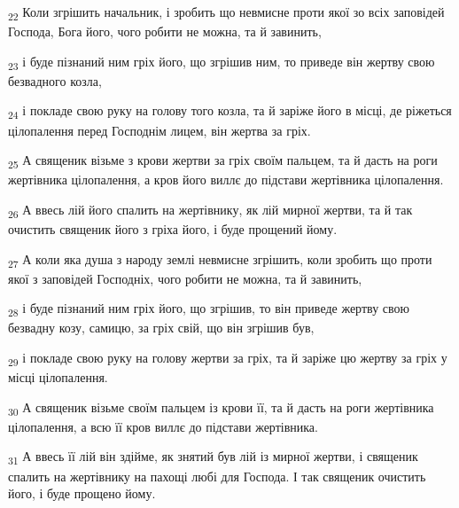 \begin{tcolorbox}
\textsubscript{22} Коли згрішить начальник, і зробить що невмисне проти якої зо всіх заповідей Господа, Бога його, чого робити не можна, та й завинить,
\end{tcolorbox}
\begin{tcolorbox}
\textsubscript{23} і буде пізнаний ним гріх його, що згрішив ним, то приведе він жертву свою безвадного козла,
\end{tcolorbox}
\begin{tcolorbox}
\textsubscript{24} і покладе свою руку на голову того козла, та й заріже його в місці, де ріжеться цілопалення перед Господнім лицем, він жертва за гріх.
\end{tcolorbox}
\begin{tcolorbox}
\textsubscript{25} А священик візьме з крови жертви за гріх своїм пальцем, та й дасть на роги жертівника цілопалення, а кров його виллє до підстави жертівника цілопалення.
\end{tcolorbox}
\begin{tcolorbox}
\textsubscript{26} А ввесь лій його спалить на жертівнику, як лій мирної жертви, та й так очистить священик його з гріха його, і буде прощений йому.
\end{tcolorbox}
\begin{tcolorbox}
\textsubscript{27} А коли яка душа з народу землі невмисне згрішить, коли зробить що проти якої з заповідей Господніх, чого робити не можна, та й завинить,
\end{tcolorbox}
\begin{tcolorbox}
\textsubscript{28} і буде пізнаний ним гріх його, що згрішив, то він приведе жертву свою безвадну козу, самицю, за гріх свій, що він згрішив був,
\end{tcolorbox}
\begin{tcolorbox}
\textsubscript{29} і покладе свою руку на голову жертви за гріх, та й заріже цю жертву за гріх у місці цілопалення.
\end{tcolorbox}
\begin{tcolorbox}
\textsubscript{30} А священик візьме своїм пальцем із крови її, та й дасть на роги жертівника цілопалення, а всю її кров виллє до підстави жертівника.
\end{tcolorbox}
\begin{tcolorbox}
\textsubscript{31} А ввесь її лій він здійме, як знятий був лій із мирної жертви, і священик спалить на жертівнику на пахощі любі для Господа. І так священик очистить його, і буде прощено йому.
\end{tcolorbox}
